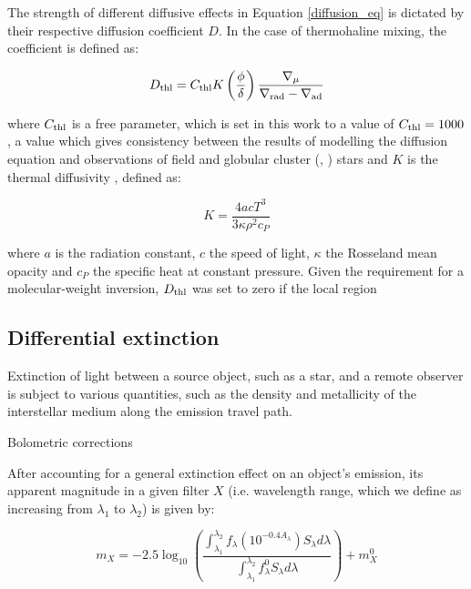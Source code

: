 \documentclass[usenatbib]{mnras}
\begin{document}
The strength of different diffusive effects in Equation \ref{diffusion_eq} is dictated by their respective diffusion coefficient $D$. In the case of thermohaline mixing, the coefficient is defined \cite{2010A&A...521A...9C} as:

\begin{equation}
D_{\textnormal{thl}} = C_{\textnormal{thl}} K \left( \frac{\phi}{\delta} \right) \frac{\nabla _{\mu}}{\nabla _{\textnormal{rad}} - \nabla _{\textnormal{ad}}}
\label{Dthl_def}
\end{equation}

where $C_{\textnormal{thl}}$ is a free parameter, which is set in this work to a value of $C_{\textnormal{thl}} = 1000$, a value which gives consistency between the results of modelling the diffusion equation and observations of field \citep{2007A&A...467L..15C} and globular cluster (\citet{2011ApJ...728...79A}, \citet{2012ApJ...749..128A}) stars and $K$ is the thermal diffusivity \citep{2017RSOS....470192S}, defined as:

\begin{equation}
K = \frac{4acT^{3}}{3\kappa\rho ^{2}c_{P}}
\label{diffusivity_def}
\end{equation}

where $a$ is the radiation constant, $c$ the speed of light, $\kappa$ the Rosseland mean opacity and $c_{P}$ the specific heat at constant pressure.
Given the requirement for a molecular-weight inversion, $D_{\textnormal{thl}}$ was set to zero if the local region 



%


\subsection{Differential extinction}
Extinction of light between a source object, such as a star, and a remote observer is subject to various quantities, such as the density and metallicity of the interstellar medium along the emission travel path.

Bolometric corrections

After accounting for a general extinction effect on an object's emission, its apparent magnitude in a given filter $X$ (i.e. wavelength range, which we define as increasing from $\lambda _{1}$ to $\lambda _{2}$) is given by:

\begin{equation}
m_{X} = -2.5 \log_{10} \left(\frac{ \int_{\lambda_{1}}^{\lambda_{2}} f_{\lambda} \left( 10^{-0.4 A_{\lambda}} \right) S_{\lambda} d\lambda }{ \int_{\lambda_{1}}^{\lambda_{2}} f_{\lambda}^{0} S_{\lambda} d\lambda }\right) + m_{X}^{0}
\label{app_mag_def}
\end{equation}
\end{document}
